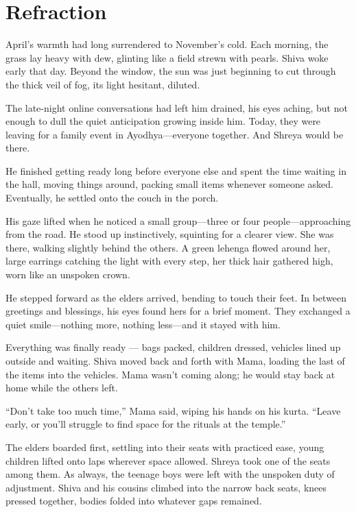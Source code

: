 \chapter{Refraction}
April's warmth had long surrendered to November's cold. Each morning, the grass lay heavy with dew, glinting like a field strewn with pearls. Shiva woke early that day. Beyond the window, the sun was just beginning to cut through the thick veil of fog, its light hesitant, diluted.

The late-night online conversations had left him drained, his eyes aching, but not enough to dull the quiet anticipation growing inside him. Today, they were leaving for a family event in Ayodhya—everyone together. And Shreya would be there.

He finished getting ready long before everyone else and spent the time waiting in the hall, moving things around, packing small items whenever someone asked. Eventually, he settled onto the couch in the porch.

His gaze lifted when he noticed a small group—three or four people—approaching from the road. He stood up instinctively, squinting for a clearer view. She was there, walking slightly behind the others. A green lehenga flowed around her, large earrings catching the light with every step, her thick hair gathered high, worn like an unspoken crown.

He stepped forward as the elders arrived, bending to touch their feet. In between greetings and blessings, his eyes found hers for a brief moment. They exchanged a quiet smile—nothing more, nothing less—and it stayed with him.

Everything was finally ready — bags packed, children dressed, vehicles lined up outside and waiting. Shiva moved back and forth with Mama, loading the last of the items into the vehicles. Mama wasn't coming along; he would stay back at home while the others left.

``Don't take too much time,'' Mama said, wiping his hands on his kurta. ``Leave early, or you'll struggle to find space for the rituals at the temple.''

The elders boarded first, settling into their seats with practiced ease, young children lifted onto laps wherever space allowed. Shreya took one of the seats among them. As always, the teenage boys were left with the unspoken duty of adjustment. Shiva and his cousins climbed into the narrow back seats, knees pressed together, bodies folded into whatever gaps remained.

